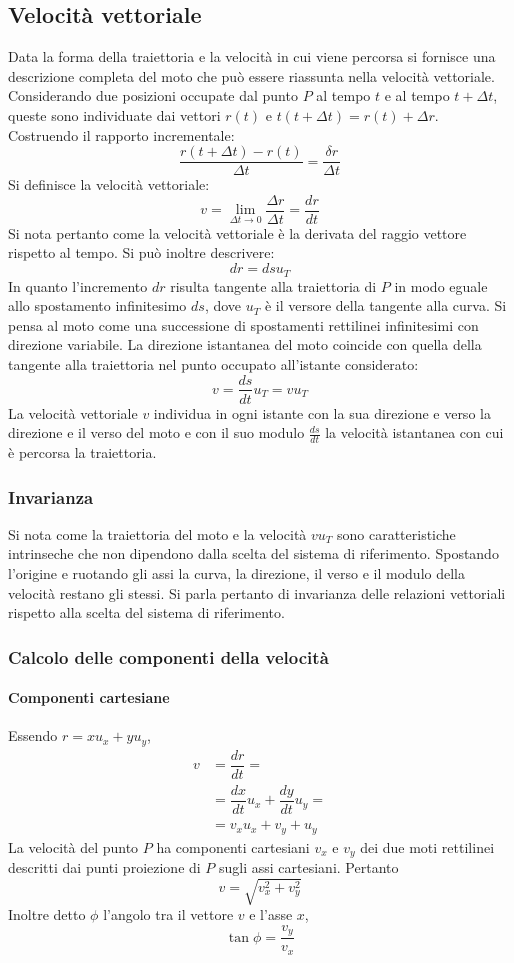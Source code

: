 	\subsection{Velocit\`a vettoriale}
	Data la forma della traiettoria e la velocit\`a in cui viene percorsa si fornisce una descrizione completa del moto che pu\`o essere riassunta nella velocit\`a vettoriale.
	Considerando due posizioni occupate dal punto $P$ al tempo $t$ e al tempo $t+\Delta t$, queste sono individuate dai vettori $r(t)$ e $t(t+\Delta t)=r(t)+\Delta r$.
	Costruendo il rapporto incrementale:
	$$\dfrac{r(t+\Delta t)-r(t)}{\Delta t}=\dfrac{\delta r}{\Delta t}$$
	Si definisce la velocit\`a vettoriale:
	$$v=\lim\limits_{\Delta t\rightarrow 0}\dfrac{\Delta r}{\Delta t}=\dfrac{dr}{dt}$$
	Si nota pertanto come la velocit\`a vettoriale \`e la derivata del raggio vettore rispetto al tempo.
	Si pu\`o inoltre descrivere:
	$$dr=dsu_T$$
	In quanto l'incremento $dr$ risulta tangente alla traiettoria di $P$ in modo eguale allo spostamento infinitesimo $ds$, dove $u_T$ \`e il versore della tangente alla curva.
	Si pensa al moto come una successione di spostamenti rettilinei infinitesimi con direzione variabile.
	La direzione istantanea del moto coincide con quella della tangente alla traiettoria nel punto occupato all'istante considerato:
	$$v=\dfrac{ds}{dt}u_T=vu_T$$
	La velocit\`a vettoriale $v$ individua in ogni istante con la sua direzione e verso la direzione e il verso del moto e con il suo modulo $\frac{ds}{dt}$ la velocit\`a istantanea con cui \`e percorsa la traiettoria.

		\subsubsection{Invarianza}
		Si nota come la traiettoria del moto e la velocit\`a $vu_T$ sono caratteristiche intrinseche che non dipendono dalla scelta del sistema di riferimento.
		Spostando l'origine e ruotando gli assi la curva, la direzione, il verso e il modulo della velocit\`a restano gli stessi.
		Si parla pertanto di invarianza delle relazioni vettoriali rispetto alla scelta del sistema di riferimento.

		\subsubsection{Calcolo delle componenti della velocit\`a}

			\paragraph{Componenti cartesiane}
			Essendo $r=xu_x+yu_y$,
			\begin{align*}
				v &=\dfrac{dr}{dt}=\\
					&=\dfrac{dx}{dt}u_x+\dfrac{dy}{dt}u_y=\\
					&=v_xu_x + v_y+u_y
			\end{align*}
			La velocit\`a del punto $P$ ha componenti cartesiani $v_x$ e $v_y$ dei due moti rettilinei descritti dai punti proiezione di $P$ sugli assi cartesiani.
			Pertanto
			$$v=\sqrt{v^2_x+v_y^2}$$
			Inoltre detto $\phi$ l'angolo tra il vettore $v$ e l'asse $x$,
			$$\tan\phi = \dfrac{v_y}{v_x}$$

